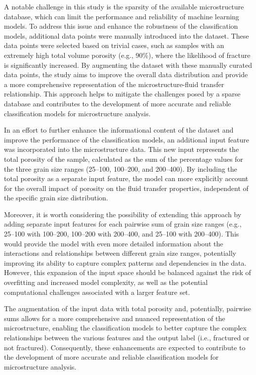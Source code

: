 \documentclass[10pt]{article}
\begin{document}
\begin{multicols}{2}
A notable challenge in this study is the sparsity of the available microstructure database, which can limit the performance and reliability of machine learning models. To address this issue and enhance the robustness of the classification models, additional data points were manually introduced into the dataset. These data points were selected based on trivial cases, such as samples with an extremely high total volume porosity (e.g., 90\%), where the likelihood of fracture is significantly increased. By augmenting the dataset with these manually curated data points, the study aims to improve the overall data distribution and provide a more comprehensive representation of the microstructure-fluid transfer relationship. This approach helps to mitigate the challenges posed by a sparse database and contributes to the development of more accurate and reliable classification models for microstructure analysis.

In an effort to further enhance the informational content of the dataset and improve the performance of the classification models, an additional input feature was incorporated into the microstructure data. This new input represents the total porosity of the sample, calculated as the sum of the percentage values for the three grain size ranges (25--100, 100--200, and 200--400). By including the total porosity as a separate input feature, the model can more explicitly account for the overall impact of porosity on the fluid transfer properties, independent of the specific grain size distribution.

Moreover, it is worth considering the possibility of extending this approach by adding separate input features for each pairwise sum of grain size ranges (e.g., 25--100 with 100--200, 100--200 with 200--400, and 25--100 with 200--400). This would provide the model with even more detailed information about the interactions and relationships between different grain size ranges, potentially improving its ability to capture complex patterns and dependencies in the data. However, this expansion of the input space should be balanced against the risk of overfitting and increased model complexity, as well as the potential computational challenges associated with a larger feature set.

The augmentation of the input data with total porosity and, potentially, pairwise sums allows for a more comprehensive and nuanced representation of the microstructure, enabling the classification models to better capture the complex relationships between the various features and the output label (i.e., fractured or not fractured). Consequently, these enhancements are expected to contribute to the development of more accurate and reliable classification models for microstructure analysis.


\end{multicols}
\end{document}

